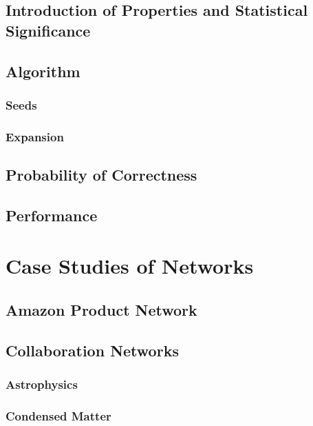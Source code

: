 \documentclass[phd,tocprelim]{cornell}
\begin{document}
\section {Introduction of Properties and Statistical Significance}

\section{Algorithm}

\subsection{Seeds}

\subsection{Expansion}

\section{Probability of Correctness}

\section {Performance}



\chapter{Case Studies of Networks}
\label{ch:datasets}

\section{Amazon Product Network}



\section{Collaboration Networks}

\subsection{Astrophysics}

\subsection{Condensed Matter}
\end{document}
